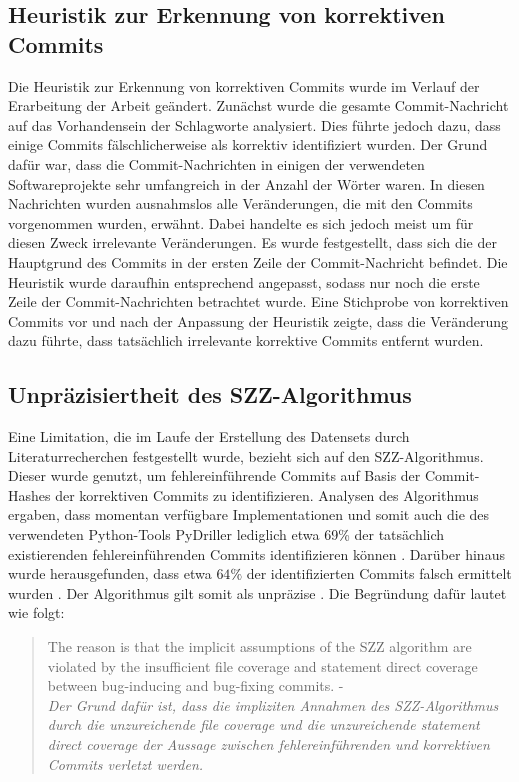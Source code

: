 \subsection*{Heuristik zur Erkennung von korrektiven Commits}
\label{heuristic}

Die Heuristik zur Erkennung von korrektiven Commits wurde im Verlauf der Erarbeitung der Arbeit geändert. Zunächst wurde die gesamte Commit-Nachricht auf das Vorhandensein der Schlagworte analysiert. Dies führte jedoch dazu, dass einige Commits fälschlicherweise als korrektiv identifiziert wurden. Der Grund dafür war, dass die Commit-Nachrichten in einigen der verwendeten Softwareprojekte sehr umfangreich in der Anzahl der Wörter waren. In diesen Nachrichten wurden ausnahmslos alle Veränderungen, die mit den Commits vorgenommen wurden, erwähnt. Dabei handelte es sich jedoch meist um für diesen Zweck irrelevante Veränderungen. Es wurde festgestellt, dass sich die der Hauptgrund des Commits in der ersten Zeile der Commit-Nachricht befindet. Die Heuristik wurde daraufhin entsprechend angepasst, sodass nur noch die erste Zeile der Commit-Nachrichten betrachtet wurde. Eine Stichprobe von korrektiven Commits vor und nach der Anpassung der Heuristik zeigte, dass die Veränderung dazu führte, dass tatsächlich irrelevante korrektive Commits entfernt wurden.

\subsection*{Unpräzisiertheit des SZZ-Algorithmus}

Eine Limitation, die im Laufe der Erstellung des Datensets durch Literaturrecherchen festgestellt wurde, bezieht sich auf den SZZ-Algorithmus. Dieser wurde genutzt, um fehlereinführende Commits auf Basis der Commit-Hashes der korrektiven Commits zu identifizieren. Analysen des Algorithmus ergaben, dass momentan verfügbare Implementationen und somit auch die des verwendeten Python-Tools PyDriller lediglich etwa 69\% der tatsächlich existierenden fehlereinführenden Commits identifizieren können \cite{Wen2019}. Darüber hinaus wurde herausgefunden, dass etwa $64\%$ der identifizierten Commits falsch ermittelt wurden \cite{Wen2019}. Der Algorithmus gilt somit als unpräzise \cite{Wen2019}. Die Begründung dafür lautet wie folgt:

\begin{quotation}
The reason is that the implicit assumptions of the SZZ algorithm
are violated by the insufficient file coverage and statement direct
coverage between bug-inducing and bug-fixing commits. - \cite{Wen2019}
\medskip \\
\textit{Der Grund dafür ist, dass die impliziten Annahmen des SZZ-Algorithmus durch die unzureichende \glqq file coverage\grqq{} und die unzureichende \glqq statement direct
coverage\grqq{} der Aussage zwischen fehlereinführenden und korrektiven Commits verletzt werden.}
\end{quotation}

